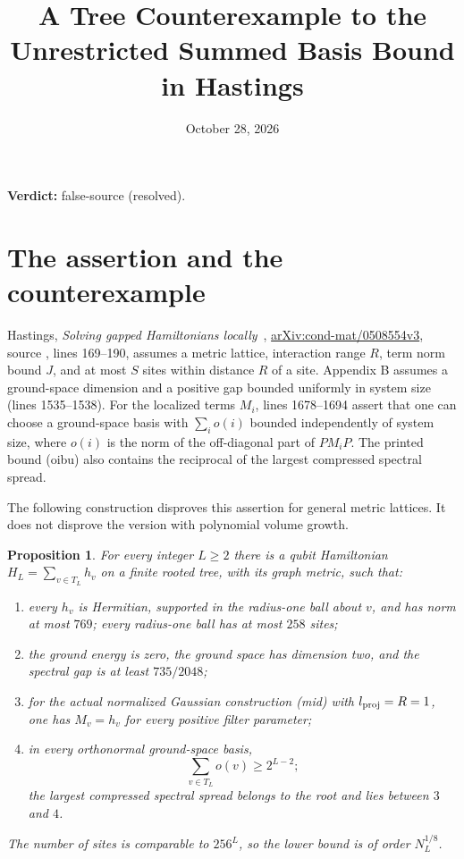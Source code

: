 \documentclass{article}
\title{A Tree Counterexample to the Unrestricted Summed Basis Bound in Hastings}
\author{}
\date{October 28, 2026}
\providecommand{\gapnote}[2]{\par\noindent\textbf{Verdict:} #1 (#2).\par}
\newtheorem{proposition}{Proposition}
\begin{document}
\maketitle
\gapnote{false-source}{resolved}

\section{The assertion and the counterexample}

Hastings, \emph{Solving gapped Hamiltonians locally}~\cite{Hastings2006Solving},
\href{https://arxiv.org/abs/cond-mat/0508554v3}{arXiv:cond-mat/0508554v3},
source , lines 169--190, assumes a metric lattice,
interaction range $R$, term norm bound $J$, and at most $S$ sites within
distance $R$ of a site. Appendix B assumes a ground-space dimension and a
positive gap bounded uniformly in system size (lines 1535--1538).
For the localized terms $M_i$, lines 1678--1694 assert that one can choose a
ground-space basis with $\sum_i o(i)$ bounded independently of system size,
where $o(i)$ is the norm of the off-diagonal part of $PM_iP$. The printed
bound (oibu) also contains the reciprocal of the largest compressed
spectral spread.

The following construction disproves this assertion for general metric
lattices. It does not disprove the version with polynomial volume growth.

\begin{proposition}
For every integer $L\ge2$ there is a qubit Hamiltonian
$H_L=\sum_{v\in T_L}h_v$ on a finite rooted tree, with its graph metric, such
that:
\begin{enumerate}
\item every $h_v$ is Hermitian, supported in the radius-one ball about $v$,
  and has norm at most $769$; every radius-one ball has at most $258$ sites;
\item the ground energy is zero, the ground space has dimension two, and
  the spectral gap is at least $735/2048$;
\item for the actual normalized Gaussian construction (mid) with
  $l_{\rm proj}=R=1$, one has $M_v=h_v$ for every positive filter parameter;
\item in every orthonormal ground-space basis,
  \begin{equation}
    \sum_{v\in T_L}o(v)\ge2^{L-2};
    \label{eq:hastings05_tree_basis_counterexample_lower}
  \end{equation}
  the largest compressed spectral spread belongs to the root and lies
  between $3$ and $4$.
\end{enumerate}
The number of sites is comparable to $256^L$, so the lower bound is of
order $N_L^{1/8}$.
\end{proposition}
\end{document}
